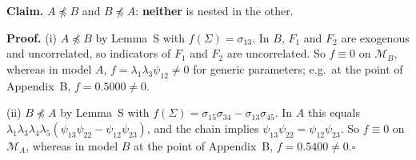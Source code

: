 \documentclass[10pt,a4paper]{article}
\newcommand{\nnest}{\not\preceq}
\begin{document}
\par\bigskip
\noindent\textbf{Claim.} $A \nnest B$ and $B \nnest A$: \textbf{neither} is nested in the other.\par\smallskip
\noindent\textbf{Proof.} (i) $A\nnest B$ by Lemma~S with $f(\Sigma)=\sigma_{13}$. In $B$, $F_1$ and $F_2$ are exogenous and uncorrelated, so indicators of $F_1$ and $F_2$ are uncorrelated. So $f\equiv0$ on $\mathcal M_B$, whereas in model $A$, $f=\lambda_1\lambda_3\psi_{12}\neq0$ for generic parameters; e.g.\ at the point of Appendix~B, $f=0.5000\neq0$.\par\smallskip
\noindent(ii) $B\nnest A$ by Lemma~S with $f(\Sigma)=\sigma_{15}\sigma_{34} - \sigma_{13}\sigma_{45}$. In $A$ this equals $\lambda_1\lambda_3\lambda_4\lambda_5(\psi_{13}\psi_{22}-\psi_{12}\psi_{23})$, and the chain implies $\psi_{13}\psi_{22}=\psi_{12}\psi_{23}$. So $f\equiv0$ on $\mathcal M_A$, whereas in model $B$ at the point of Appendix~B, $f=0.5400\neq0$.\hfill$\square$\par\medskip
{}

\clearpage
\end{document}
